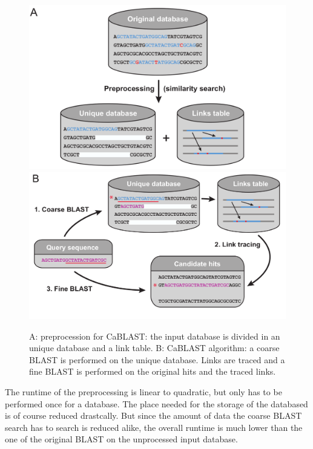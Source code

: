 \documentclass[acmtocl,acmnow]{article}
\begin{document}
\begin{center}
  \begin{figure}
    \includegraphics[width=\textwidth]{img/Compgenp1.png}
    \includegraphics[width=\textwidth]{img/Compgenp2.png}
    \label{CaBLAST}
    \caption{A: preprocession for CaBLAST: the input database is divided in an unique database
    and a link table. B: CaBLAST algorithm: a coarse BLAST is performed on the unique database. Links are traced and a
    fine BLAST is performed on the original hits and the traced links. \cite{LohBamBer}}
  \end{figure}
  \end{center}
  
The runtime of the preprocessing is linear to quadratic, but only has to be performed once for a database. The place needed
for the storage of the databased is of course reduced drastcally. But since the 
amount of data the coarse BLAST search has to search is reduced alike, the overall runtime is much lower than the one
of the original BLAST on the unprocessed input database.
\end{document}
